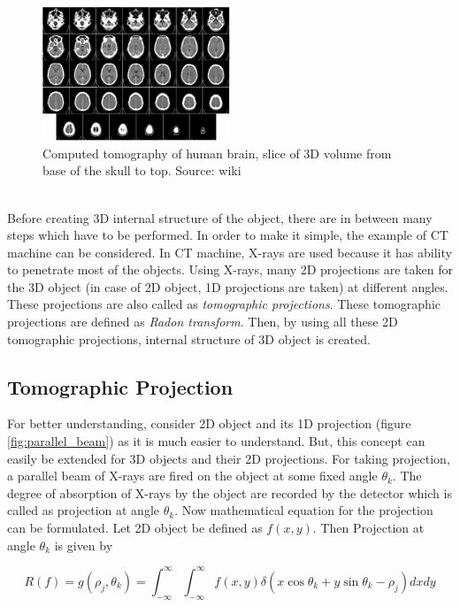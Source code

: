 \documentclass[twoside]{iitbreport}
\begin{document}
\begin{figure}[h]
\includegraphics[width=0.5\textwidth]{Computed_tomography_of_human_brain}
\centering
\captionsetup{justification=centering}
\caption{Computed tomography of human brain, slice of 3D volume from base of the skull to top. Source: wiki}
\label{fig:ct_humna_brain}
\end{figure}

\noindent\\
Before creating 3D internal structure of the object, there are in between many steps which have to be performed. In order to make it simple, the example of CT machine can be considered. In CT machine, X-rays are used because it has ability to penetrate most of the objects. Using X-rays, many 2D projections are taken for the 3D object (in case of 2D object, 1D projections are taken) at different angles. These projections are also called as \textit{tomographic projections}. These tomographic projections are defined as \textit{Radon transform}. Then, by using all these 2D tomographic projections,  internal structure of 3D object is created.

\subsection{Tomographic Projection}\label{sec:tomo_pro}
For better understanding, consider 2D object and its 1D projection (figure \ref{fig:parallel_beam}) as it is much easier to understand. But, this concept can easily be extended for 3D objects and their 2D projections. For taking projection, a parallel beam of X-rays are fired on the object at some fixed angle ${\theta_k}$. The degree of absorption of X-rays by the object are recorded by the detector which is called as projection at angle ${\theta_k}$. Now mathematical equation for the projection can be formulated. Let 2D object be defined as $f(x,y)$. Then Projection at angle ${\theta_k}$ is given by

\begin{equation}
R(f) = g(\rho_j,\theta_k) = \int_{-\infty}^{\infty} \int_{-\infty}^{\infty} f(x,y) \delta(x\cos\theta_k+y\sin\theta_k - \rho_j)  dxdy
\label{eq:radon_trasform}
\end{equation}
\end{document}
